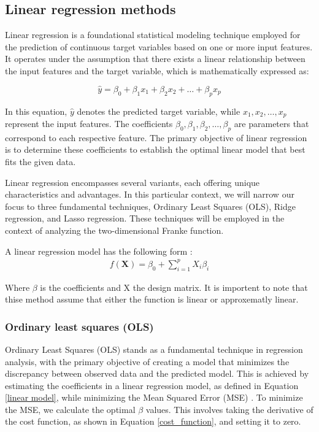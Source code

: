 \thispagestyle{plain}

\subsection{Linear regression methods}

\noindent Linear regression is a foundational statistical modeling technique employed for the prediction of continuous target variables
based on one or more input features. It operates under the assumption that there exists a linear relationship between the input features
and the target variable, which is mathematically expressed as:

\[
\hat{y} = \beta_0 + \beta_1 x_1 + \beta_2 x_2 + \ldots + \beta_p x_p
\]

In this equation, $\hat{y}$ denotes the predicted target variable, while $x_1, x_2, \ldots, x_p$ represent the input features. The 
coefficients $\beta_0, \beta_1, \beta_2, \ldots, \beta_p$ are parameters that correspond to each respective feature. The primary objective 
of linear regression is to determine these coefficients to establish the optimal linear model that best fits the given data.

Linear regression encompasses several variants, each offering unique characteristics and advantages. In this particular context, 
we will narrow our focus to three fundamental techniques, Ordinary Least Squares (OLS), Ridge regression, and Lasso regression. These 
techniques will be employed in the context of analyzing the two-dimensional Franke function. 

A linear regression model has the following form :
\begin{align}
    f(\textbf{X}) = \beta_0 + \sum^{p}_{i=1} X_i \beta_i \label{linear model} %
\end{align}

Where $\beta$ is the coefficients and X the design matrix. It is importent to note 
that thise method assume that either the function is linear or approxematly linear.


\subsubsection{Ordinary least squares (OLS)}
\noindent Ordinary Least Squares (OLS) stands as a fundamental technique in 
regression analysis, with the primary objective of creating a model that 
minimizes the discrepancy between observed data and the predicted model. 
This is achieved by estimating the coefficients in a linear regression model, 
as defined in Equation \eqref{linear model}, while minimizing the Mean Squared 
Error (MSE) \cite{AY}. To minimize the MSE, we calculate the optimal $\beta$ values. This involves 
taking the derivative of the cost function, as shown in Equation \eqref{cost_function}, 
and setting it to zero.

